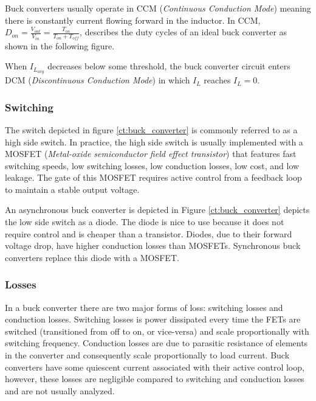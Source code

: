 \documentclass[main.tex]{subfiles}
\begin{document}
\noindent Buck converters usually operate in CCM (\textit{Continuous Conduction Mode}) meaning there is constantly current flowing forward in the inductor. In CCM, $D_{on} = \frac{V_{out}}{V_{in}} = \frac{T_{on}}{T_{on} + T_{off}}$, describes the duty cycles of an ideal buck converter as shown in the following figure.


When $I_{L_{avg}}$ decreases below some threshold, the buck converter circuit enters DCM (\textit{Discontinuous Conduction Mode}) in which $I_L$ reaches $I_L = 0$.



\subsubsection{Switching}
The switch depicted in figure \ref{ct:buck_converter} is commonly referred to as a high side switch. In practice, the high side switch is usually implemented with a MOSFET (\textit{Metal-oxide semiconductor field effect transistor}) that features fast switching speeds, low switching losses, low conduction losses, low cost, and low leakage. The gate of this MOSFET requires active control from a feedback loop to maintain a stable output voltage.

\noindent An asynchronous buck converter is depicted in Figure \ref{ct:buck_converter} depicts the low side switch as a diode. The diode is nice to use because it does not require control and is cheaper than a transistor. Diodes, due to their forward voltage drop, have higher conduction losses than MOSFETs. Synchronous buck converters replace this diode with a MOSFET. 


\subsubsection{Losses}
In a buck converter there are two major forms of loss: switching losses and conduction losses. Switching losses is power dissipated every time the FETs are switched (transitioned from off to on, or vice-versa) and scale proportionally with switching frequency. Conduction losses are due to parasitic resistance of elements in the converter and consequently scale proportionally to load current. Buck converters have some quiescent current associated with their active control loop, however, these losses are negligible compared to switching and conduction losses and are not usually analyzed. 
\end{document}
